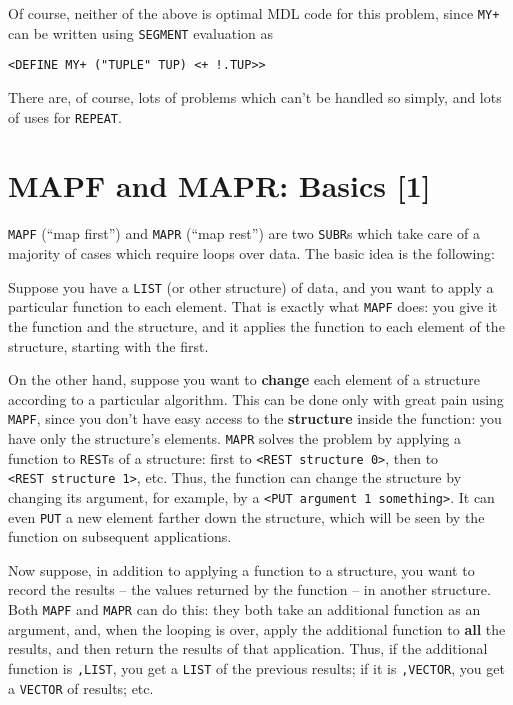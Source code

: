 \documentclass[a4paper]{scrbook}
\begin{document}
Of course, neither of the above is optimal MDL code for this problem, since \texttt{MY+} can be written using
\texttt{SEGMENT} evaluation as

\begin{verbatim}
<DEFINE MY+ ("TUPLE" TUP) <+ !.TUP>>
\end{verbatim}

There are, of course, lots of problems which can't be handled so simply, and lots of uses for \texttt{REPEAT}.

\section{MAPF and MAPR: Basics {[}1{]}}\label{mapf-and-mapr-basics-1}

\texttt{MAPF}  (``map first'') and \texttt{MAPR}  (``map rest'')
are two \texttt{SUBR}s which take care of a majority of cases which require loops over data. The basic idea is the
following:

Suppose you have a \texttt{LIST} (or other structure) of data, and you want to apply a particular function to each element.
That is exactly what \texttt{MAPF} does: you give it the function and the structure, and it applies the function to each
element of the structure, starting with the first.

On the other hand, suppose you want to \textbf{change} each element of a structure according to a particular algorithm.
This can be done only with great pain using \texttt{MAPF}, since you don't have easy access to the \textbf{structure}
inside the function: you have only the structure's elements. \texttt{MAPR} solves the problem by applying a function to
\texttt{REST}s of a structure: first to \texttt{\textless{}REST\ structure\ 0\textgreater{}}, then to
\texttt{\textless{}REST\ structure\ 1\textgreater{}}, etc. Thus, the function can change the structure by changing its
argument, for example, by a \texttt{\textless{}PUT\ argument\ 1\ something\textgreater{}}. It can even \texttt{PUT} a new
element farther down the structure, which will be seen by the function on subsequent applications.

Now suppose, in addition to applying a function to a structure, you want to record the results -- the values returned by
the function -- in another structure. Both \texttt{MAPF} and \texttt{MAPR} can do this: they both take an additional
function as an argument, and, when the looping is over, apply the additional function to \textbf{all} the results, and then
return the results of that application. Thus, if the additional function is \texttt{,LIST}, you get a \texttt{LIST} of the
previous results; if it is \texttt{,VECTOR}, you get a \texttt{VECTOR} of results; etc.
\end{document}
